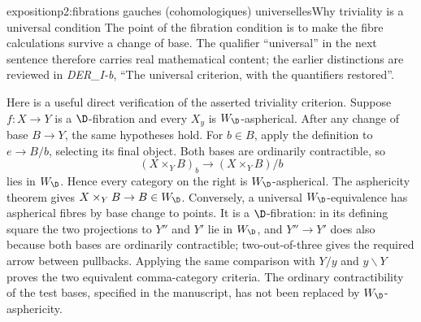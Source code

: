 \begin{dcomment}{exposition}{p2:fibrations gauches (cohomologiques) universelles}{Why triviality is a universal condition}
The point of the fibration condition is to make the fibre calculations survive a change of base. The qualifier ``universal'' in the next sentence therefore carries real mathematical content; the earlier distinctions are reviewed in \emph{DER\_I-b}, ``The universal criterion, with the quantifiers restored''.

Here is a useful direct verification of the asserted triviality criterion. Suppose $f:X\to Y$ is a $\D$-fibration and every $X_y$ is $W_{\D}$-aspherical. After any change of base $B\to Y$, the same hypotheses hold. For $b\in B$, apply the definition to $e\to B/b$, selecting its final object. Both bases are ordinarily contractible, so
\[
 (X\times_Y B)_b\longrightarrow (X\times_Y B)/b
\]
lies in $W_{\D}$. Hence every category on the right is $W_{\D}$-aspherical. The asphericity theorem gives $X\times_Y B\to B\in W_{\D}$. Conversely, a universal $W_{\D}$-equivalence has aspherical fibres by base change to points. It is a $\D$-fibration: in its defining square the two projections to $Y''$ and $Y'$ lie in $W_{\D}$, and $Y''\to Y'$ does also because both bases are ordinarily contractible; two-out-of-three gives the required arrow between pullbacks. Applying the same comparison with $Y/y$ and $y\backslash Y$ proves the two equivalent comma-category criteria. The ordinary contractibility of the test bases, specified in the manuscript, has not been replaced by $W_{\D}$-asphericity.
\end{dcomment}

